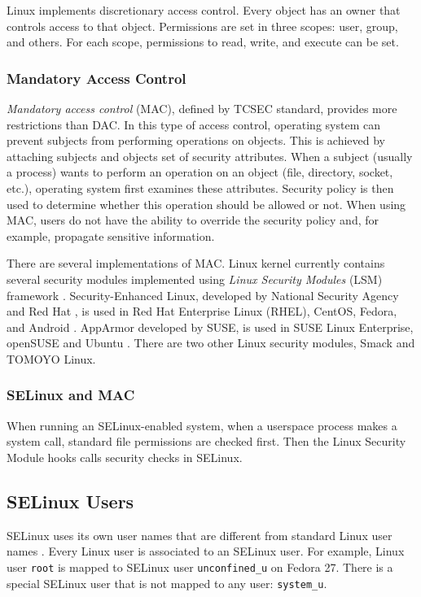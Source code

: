 Linux implements discretionary access control. Every object has an owner that
controls access to that object. Permissions are set in three scopes: user,
group, and others. For each scope, permissions to read, write, and execute can
be set.

\subsubsection{Mandatory Access Control}
\emph{Mandatory access control} (MAC), defined by TCSEC standard, provides more
restrictions than DAC. In this type of access control, operating system can
prevent subjects from performing operations on objects. This is achieved by
attaching subjects and objects set of security attributes. When a subject
(usually a process) wants to perform an operation on an object (file, directory,
socket, etc.), operating system first examines these attributes. Security
policy is then used to determine whether this operation should be allowed or
not. When using MAC, users do not have the ability to override the security
policy and, for example, propagate sensitive information.

There are several implementations of MAC. Linux kernel currently contains
several security modules implemented using \emph{Linux Security Modules} (LSM)
framework \cite{lsmusage}. Security-Enhanced Linux, developed by National
Security Agency and Red Hat \cite{selinuxcontr}, is used in Red Hat Enterprise
Linux (RHEL), CentOS, Fedora, and Android
\cite{selinuxguide,selinuxguidefedora,selinuxandroid}. AppArmor developed by
SUSE, is used in SUSE Linux Enterprise, openSUSE and Ubuntu
\cite{apparmor,apparmorubuntu}. There are two other Linux security modules,
Smack and TOMOYO Linux.

\subsubsection{SELinux and MAC}
When running an SELinux-enabled system, when a userspace process makes a system
call, standard file permissions are checked first. Then the Linux Security
Module hooks calls security checks in SELinux.

\subsection{SELinux Users}
\label{selinuxuser}
SELinux uses its own user names that are different from standard Linux user
names \cite[p.~24]{tsn}. Every Linux user is associated to an SELinux user. For
example, Linux user \texttt{root} is mapped to SELinux user
\texttt{unconfined\_u} on Fedora 27. There is a special SELinux user that is
not mapped to any user: \texttt{system\_u}.

